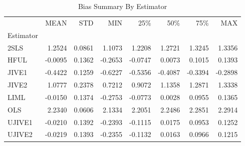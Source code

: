 \begin{table}[ht]
\centering
\caption{Bias Summary By Estimator}
\begin{tabular}{lrrrrrrr}
\toprule
 & MEAN & STD & MIN & 25\% & 50\% & 75\% & MAX \\
Estimator &  &  &  &  &  &  &  \\
\midrule
2SLS & 1.2524 & 0.0861 & 1.1073 & 1.2208 & 1.2721 & 1.3245 & 1.3356 \\
HFUL & -0.0095 & 0.1362 & -0.2653 & -0.0747 & 0.0073 & 0.1015 & 0.1393 \\
JIVE1 & -0.4422 & 0.1259 & -0.6227 & -0.5356 & -0.4087 & -0.3394 & -0.2898 \\
JIVE2 & 1.0777 & 0.2378 & 0.7212 & 0.9072 & 1.1358 & 1.2871 & 1.3338 \\
LIML & -0.0150 & 0.1374 & -0.2753 & -0.0773 & 0.0028 & 0.0955 & 0.1365 \\
OLS & 2.2340 & 0.0606 & 2.1334 & 2.2051 & 2.2486 & 2.2851 & 2.2914 \\
UJIVE1 & -0.0210 & 0.1392 & -0.2393 & -0.1115 & 0.0175 & 0.0953 & 0.1252 \\
UJIVE2 & -0.0219 & 0.1393 & -0.2355 & -0.1132 & 0.0163 & 0.0966 & 0.1215 \\
\bottomrule
\end{tabular}
\end{table}
